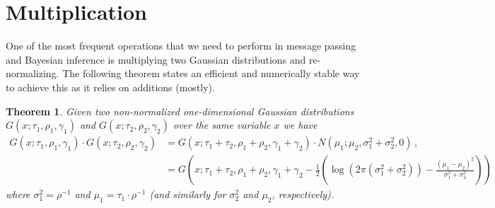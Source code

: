 \documentclass[a4paper]{article}
\newtheorem{thm}{Theorem}
\begin{document}
\section*{Multiplication}
One of the most frequent operations that we need to perform in message passing and Bayesian inference is multiplying two Gaussian distributions and re-normalizing. The following theorem states an efficient and numerically stable way to achieve this as it relies on additions (mostly).
\begin{thm} \label{thm:multiplication}
    Given two non-normalized one-dimensional Gaussian distributions $G(x;\tau_1,\rho_1,\gamma_1)$ and $G(x;\tau_2,\rho_2,\gamma_2)$ over the same variable $x$ we have
    \begin{align}
        G(x;\tau_1,\rho_1,\gamma_1) \cdot G(x;\tau_2,\rho_2,\gamma_2) & = G(x;\tau_1 + \tau_2,\rho_1 + \rho_2,\gamma_1+\gamma_2) \cdot N\left(\mu_1;\mu_2,\sigma_1^2+\sigma_2^2,0\right) \label{eq:gauss_mul}\,,                                                                                      \\
                                                                      & = G\left(x;\tau_1 + \tau_2,\rho_1 + \rho_2,\gamma_1+\gamma_2 - \frac{1}{2}\left(\log\left(2\pi \left(\sigma_1^2+\sigma_2^2\right)\right) - \frac{\left(\mu_1 - \mu_2\right)^2}{\sigma_1^2+\sigma_2^2}\right)\right) \nonumber
    \end{align}
    where $\sigma_1^2=\rho^{-1}$ and $\mu_1 = \tau_1\cdot\rho^{-1}$ (and similarly for $\sigma_2^2$ and $\mu_2$, respectively).
\end{thm}
\end{document}
